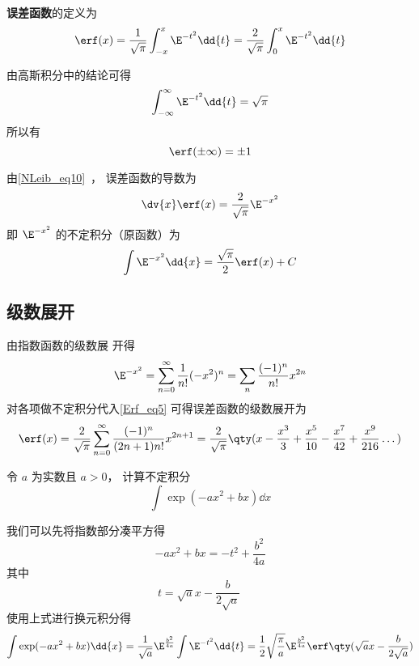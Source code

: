 

\textbf{误差函数}的定义为%
\begin{equation}\label{Erf_eq1}
\erf(x) = \frac{1}{\sqrt{\pi}} \int_{-x}^x \E^{-t^2} \dd{t}
= \frac{2}{\sqrt{\pi}} \int_{0}^x \E^{-t^2} \dd{t}
\end{equation}

由高斯积分中的结论可得
\begin{equation}
\int_{-\infty}^\infty \E^{-t^2} \dd{t} = \sqrt{\pi}
\end{equation}
所以有
\begin{equation}
\erf(\pm\infty) = \pm 1
\end{equation}

由\autoref{NLeib_eq10}~， 误差函数的导数为
\begin{equation}
\dv{x} \erf(x) = \frac{2}{\sqrt{\pi}} \E^{-x^2}
\end{equation}
即 $\E^{-x^2}$ 的不定积分（原函数）为
\begin{equation}\label{Erf_eq5}
\int \E^{-x^2} \dd{x} = \frac{\sqrt{\pi}}{2} \erf(x) + C
\end{equation}

\subsection{级数展开}
由指数函数的级数展%
开得
\begin{equation}
\E^{-x^2} = \sum_{n=0}^\infty \frac{1}{n!} (-x^2)^n = \sum_n \frac{(-1)^n}{n!} x^{2n}
\end{equation}
对各项做不定积分代入\autoref{Erf_eq5} 可得误差函数的级数展开为
\begin{equation}
\erf(x) = \frac{2}{\sqrt{\pi}} \sum_{n=0}^\infty \frac{(-1)^n}{(2n+1)n!} x^{2n+1}
= \frac{2}{\sqrt{\pi}}\qty(x - \frac{x^3}{3} + \frac{x^5}{10} - \frac{x^7}{42} + \frac{x^9}{216} \dots)
\end{equation}

\begin{example}{}\label{Erf_ex1}
令 $a$ 为实数且 $a > 0$， 计算不定积分
\begin{equation}
\int \exp(-ax^2 + bx) \dd{x}
\end{equation}

我们可以先将指数部分凑平方得
\begin{equation}
-ax^2 + bx = -t^2 + \frac{b^2}{4a}
\end{equation}
其中
\begin{equation}
t = \sqrt{a} x - \frac{b}{2\sqrt{a}} \qquad
\end{equation}
使用上式进行换元积分得
\begin{equation}
\int \exp(-ax^2 + bx) \dd{x} = \frac{1}{\sqrt{a}} \E^{\frac{b^2}{4a}} \int \E^{-t^2} \dd{t}
= \frac12 \sqrt{\frac{\pi}{a}} \E^{\frac{b^2}{4a}} \erf\qty(\sqrt{a} x - \frac{b}{2\sqrt{a}})
\end{equation}
\end{example}

